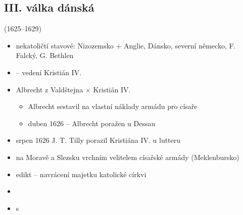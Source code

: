 \subsection{III. válka dánská}(1625--1629)
\begin{itemize}
\item nekatoličtí stavové: Nizozemsko + Anglie, Dánsko, severní německo, F. Falcký, G. Bethlen
\item {} -- vedení Kristián IV.
\item Albrecht z Valdštejna $\times$ Kristián IV.
	\begin{itemize}
	\item Albrecht sestavil na vlastní náklady armádu pro císaře
	\item duben 1626 -- Albrecht poražen u Dessau
	\end{itemize}
\item srpen 1626 J. T. Tilly porazil Kristiána IV. u lutteru
\item {} na Moravě a Slezsku
\ra vrchním velitelem císařské armády (Meklenbursko)
\item {} edikt -- navrácení majetku katolické církvi
\item {}
\item s
\end{itemize}


